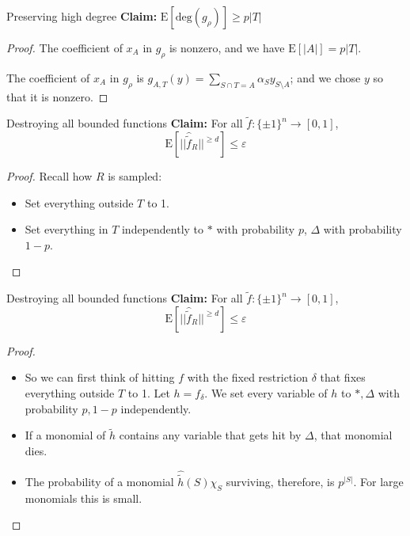 \begin{frame}{Preserving high degree}
	\textbf{Claim: }$\text{E} [\text{deg}(g_{\rho})] \geq p|T|$
	\begin{proof}
		The coefficient of $x_A$ in $g_{\rho}$ is nonzero, and we have $\text{E}[|A|] = p|T|$. \newline
		
		The coefficient of $x_A$ in $g_{\rho}$ is $g_{A,T}(y)= \displaystyle \sum_{S\cap T=A} \alpha_S y_{S \setminus A}$; and we chose $y$ so that it is nonzero.
	\end{proof}
	
\end{frame}


\begin{frame}{Destroying all bounded functions}
	\textbf{Claim: }For all $\tilde{f}: \{ \pm 1\}^n \rightarrow [0,1]$,
	$$ \text{E} [|| \hat{\tilde{f}}_R ||^{\geq d}] \leq \varepsilon$$
	\begin{proof}
		Recall how $R$ is sampled:
		\begin{itemize}
			\item Set everything outside $T$ to 1.
			\item Set everything in $T$ independently to $*$ with probability $p$, $\Delta$ with probability $1-p$.
		\end{itemize}
	\end{proof}
	
\end{frame}

\begin{frame}{Destroying all bounded functions}
	\textbf{Claim: }For all $\tilde{f}: \{ \pm 1\}^n \rightarrow [0,1]$,
	$$ \text{E} [|| \hat{\tilde{f}}_R ||^{\geq d}] \leq \varepsilon$$
	\begin{proof}
		\begin{itemize}
		\item<1-> So we can first think of hitting $f$ with the fixed restriction $\delta$ that fixes everything outside $T$ to 1. Let $h= f_{\delta}$. We set every variable of $h$ to $*, \Delta$ with probability $p,1-p$ independently.
		\item<2-> If a monomial of $\tilde{h}$ contains any variable that gets hit by $\Delta$, that monomial dies.
		\item<3-> The probability of a monomial $\hat{\tilde{h}}(S) \chi_S$ surviving, therefore, is $p^{|S|}$. For large monomials this is small.
		\end{itemize}
	\end{proof}
	
\end{frame}


